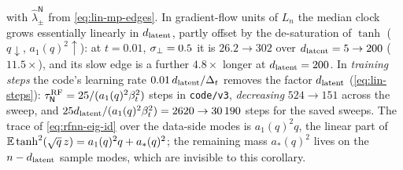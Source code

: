 \begin{corollary}
\begin{enumerate}
\begin{equation}
\end{equation}
with $\widehat\lambda^{\mathsf N}_\pm$ from \eqref{eq:lin-mp-edges}. In gradient-flow units of $L_n$ the median clock grows essentially linearly in $d_{\mathrm{latent}}$, partly offset by the de-saturation of $\tanh$ ($q\downarrow$, $a_1(q)^2\uparrow$): at $t=0.01$, $\sigma_{\perp}=0.5$ it is $26.2\to302$ over $d_{\mathrm{latent}}=5\to200$ ($11.5\times$), and its slow edge is a further $4.8\times$ longer at $d_{\mathrm{latent}}=200$. In \emph{training steps} the code's learning rate $0.01\,d_{\mathrm{latent}}/\Delta_t$ removes the factor $d_{\mathrm{latent}}$ (\eqref{eq:lin-steps}): $\tau^{\rm RF}_{\mathsf N}=25/(a_1(q)^2\beta_t^2)$ steps in \texttt{code/v3}, \emph{decreasing} $524\to151$ across the sweep, and $25d_{\mathrm{latent}}/(a_1(q)^2\beta_t^2)=2620\to30\,190$ steps for the saved sweeps. The trace of \eqref{eq:rfnn-eig-id} over the data-side modes is $a_1(q)^2q$, the linear part of $\mathbb{E}\tanh^2(\sqrt q\,z)=a_1(q)^2q+a_*(q)^2$; the remaining mass $a_*(q)^2$ lives on the $n-d_{\mathrm{latent}}$ sample modes, which are invisible to this corollary.
\end{enumerate}
\end{corollary}
